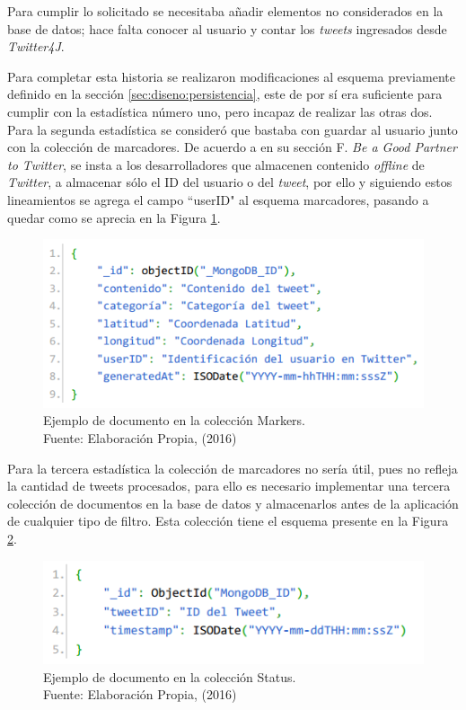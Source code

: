 Para cumplir lo solicitado se necesitaba añadir elementos no considerados en la base de datos; hace falta conocer al usuario y contar los \textit{tweets} ingresados desde \textit{Twitter4J}.

Para completar esta historia se realizaron modificaciones al esquema previamente definido en la sección \ref{sec:diseno:persistencia}, este de por sí era suficiente para cumplir con la estadística número uno, pero incapaz de realizar las otras dos. Para la segunda estadística se consideró que bastaba con guardar al usuario junto con la colección de marcadores. De acuerdo a \citep{TwitterAgreement} en su sección F. \textit{Be a Good Partner to Twitter}, se insta a los desarrolladores que almacenen contenido \textit{offline} de \textit{Twitter}, a almacenar sólo el ID del usuario o del \textit{tweet}, por ello y siguiendo estos lineamientos se agrega el campo ``userID" al esquema marcadores, pasando a quedar como se aprecia en la Figura \ref{fig:esquemaMarker2}.

\begin{figure}[H]
	\centering
	\captionsetup{justification=centering}
	\includegraphics[scale=0.8]{images/Marker2.png}
	\caption[Ejemplo de documento en la colección Markers.]{Ejemplo de documento en la colección Markers.\\Fuente: Elaboración Propia, (2016)}
	\label{fig:esquemaMarker2}
\end{figure}

Para la tercera estadística la colección de marcadores no sería útil, pues no refleja la cantidad de tweets procesados, para ello es necesario implementar una tercera colección de documentos en la base de datos y almacenarlos antes de la aplicación de cualquier tipo de filtro. Esta colección tiene el esquema presente en la Figura \ref{fig:esquemaTweet}.

\begin{figure}[H]
	\centering
	\captionsetup{justification=centering}
	\includegraphics[scale=0.8]{images/status.png}
	\caption[Ejemplo de documento en la colección Status.]{Ejemplo de documento en la colección Status.\\Fuente: Elaboración Propia, (2016)}
	\label{fig:esquemaTweet}
\end{figure}


